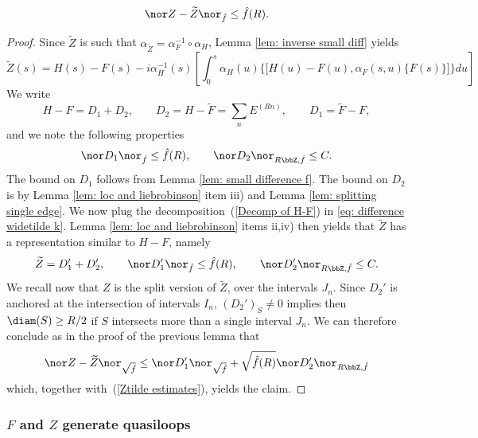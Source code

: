 \begin{lemma}\label{lem: small differences k}
	$$
	\nor Z-\widetilde Z\nor_{\hat{f}} \leq \hat{f}(R).
	$$
\end{lemma}
\begin{proof}
	Since $\widetilde Z$ is such that $\alpha_{\widetilde Z}=\alpha_{F}^{-1} \circ \alpha_H$, Lemma \ref{lem: inverse small diff} yields
	\begin{equation}\label{eq: difference widetilde k}
		\widetilde Z(s)=H(s)-F(s)- i \alpha^{-1}_{H}(s)\left[\int_0^s \alpha_{H}(u)\Big\{\big[H(u) - F(u),\alpha_F(s,u)\{F(s)\}\big]\Big\}du \right]
	\end{equation}
	We write
	\begin{equation}\label{Decomp of H-F}
		H-F = D_1+D_2,\qquad  D_2= H - \widetilde F = \sum_n E^{(Rn)}, \qquad  D_1= \widetilde F - F,
	\end{equation}
	and we note the following properties
	$$
	\nor D_1\nor_{\hat{f}}\leq \hat{f}(R),\qquad   \nor D_2\nor_{R\bbZ,\hat{f}}\leq C.
	$$ 
	The bound on $D_1$ follows from Lemma \ref{lem: small difference f}. The bound on $D_2$ is by Lemma \ref{lem: loc and liebrobinson} item iii) and Lemma \ref{lem: splitting single edge}.  
	We now plug the decomposition~(\ref{Decomp of H-F}) in \eqref{eq: difference widetilde k}. Lemma \ref{lem: loc and liebrobinson} items ii,iv) then yields that $\widetilde Z$ has a representation similar to $H-F$, namely
	\begin{equation}\label{Ztilde estimates}
		\widetilde Z = D_1'+D'_2,\qquad   \nor D_1'\nor_{\hat{f}} \leq   \hat{f}(R),\qquad  \nor D_2'\nor_{R\bbZ,\hat{f}} \leq   C.
	\end{equation}
	We recall now that $Z$ is the split version of $\widetilde Z$, over the intervals $J_n$. Since $D_2'$ is anchored at the intersection of intervals $I_n$, $(D_2')_S \neq 0$ implies then $\diam(S) \geq R/2$ if $S$ intersects more than a single interval $J_n$. We can therefore conclude as in the proof of the previous lemma that
	$$
	\nor Z-\widetilde Z \nor_{\sqrt{\hat{f}}} \leq  \nor D_1' \nor_{\sqrt{\hat{f}}}+ \sqrt{\hat{f}(R)} \nor D_2'\nor_{R\bbZ,\hat{f}}
	$$  which, together with~(\ref{Ztilde estimates}), yields the claim.
\end{proof}









\subsubsection{$F$ and $Z$ generate quasiloops}\label{sec: quasiloops}




